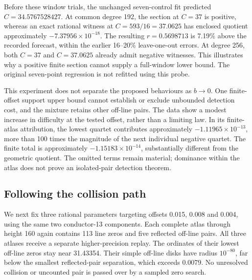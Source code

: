 \documentclass[11pt]{article}
\theoremstyle{remark}
\begin{document}
Before these window trials, the unchanged seven-control fit predicted
\(C=34.5767528427\). At common degree 192, the section at \(C=37\) is
positive, whereas an exact rational witness at
\(C=593/16=37.0625\) has enclosed quotient approximately
\(-7.37956\times10^{-18}\). The resulting
\(r=0.5698713\) is 7.19\% above the recorded forecast, within the earlier
16--20\% leave-one-out errors. At degree 256, both \(C=37\) and
\(C=37.0625\) already admit negative witnesses. This illustrates why a
positive finite section cannot supply a full-window lower bound.
The original seven-point regression is not refitted using this probe.

This experiment does not separate the proposed behaviours as \(b\to0\).
One finite-offset support upper bound cannot establish or exclude
unbounded detection cost, and the mixture retains other off-line pairs.
The data show a modest increase in difficulty at the tested offset, rather
than a limiting law. In its finite-atlas attribution, the lowest quartet
contributes approximately \(-1.11965\times10^{-13}\), more than 100 times
the magnitude of the next individual negative quartet. The finite total
is approximately \(-1.15183\times10^{-14}\), substantially different from
the geometric quotient. The omitted terms remain material; dominance
within the atlas does not prove an isolated-pair detection theorem.

\subsection{Following the collision path}\label{sec:collisionpath}
We next fix three rational parameters targeting offsets 0.015, 0.008 and
0.004, using the same two conductor-13 components. Each complete atlas
through height 160 again contains 113 line zeros and five reflected
off-line pairs. All three atlases receive a separate higher-precision
replay. The ordinates of their lowest off-line zeros stay near 31.43354.
Their simple off-line disks have radius \(10^{-80}\), far below the smallest
reflected-pair separation, which exceeds 0.0079. No unresolved collision
or uncounted pair is passed over by a sampled zero search.
\end{document}
